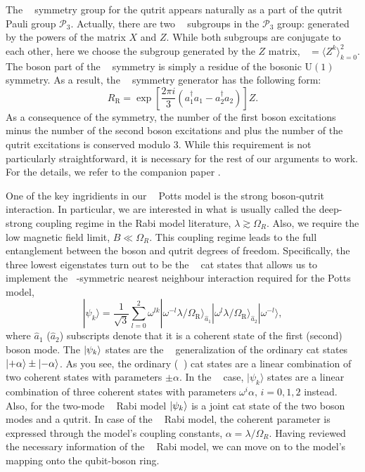 \documentclass[reprint, aps, prx, amsmath, amssymb, longbibliography, superscriptaddress]{revtex4-2}
\DeclareMathOperator{\Zthree}{\mathbb{Z}_3}
\DeclareMathOperator{\Ztwo}{\mathbb{Z}_2}
\begin{document}
The $\Zthree$ symmetry group for the qutrit appears naturally as a part of the qutrit Pauli group $\mathcal{P}_3$. Actually, there are two $\Zthree$ subgroups in the $\mathcal{P}_3$ group: generated by the powers of the matrix $X$ and $Z$. While both subgroups are conjugate to each other, here we choose the subgroup generated by the $Z$ matrix, $\Zthree = \langle Z^k \rangle_{k=0}^2$. The boson part of the $\Zthree$ symmetry is simply a residue of the bosonic $\mathrm{U(1)}$ symmetry. As a result, the $\Zthree$ symmetry generator has the following form:
\begin{equation}
     R_{\text{R}} = \exp\left[\frac{2\pi i}{3}(a_1^{\dagger}  a_1 -  a_2^{\dagger}  a_2)\right] Z.
\end{equation}
As a consequence of the symmetry, the number of the first boson excitations minus the number of the second boson excitations and plus the number of the qutrit excitations is conserved modulo 3. While this requirement is not particularly straightforward, it is necessary for the rest of our arguments to work. For the details, we refer to the companion paper \cite{lotkov_cat_}.

One of the key ingridients in our $\Zthree$ Potts model is the strong boson-qutrit interaction. In particular, we are interested in what is usually called the deep-strong coupling regime in the Rabi model literature, $\lambda \gtrsim \Omega_R$. Also, we require the low magnetic field limit, $ B \ll \Omega_R$. This coupling regime leads to the full entanglement between the boson and qutrit degrees of freedom. Specifically, the three lowest eigenstates turn out to be the $\Zthree$ cat states \cite{lotkov_cat_} that allows us to implement the $\Zthree$-symmetric nearest neighbour interaction required for the Potts model,
\begin{equation}
\label{three-cat-states}
    |\psi_k\rangle = \frac{1}{\sqrt{3}}\sum\limits_{l=0}^2 \omega^{lk}|\omega^{-l} \lambda/\Omega_{\text{R}}\rangle_{\hat a_1}|\omega^l \lambda/\Omega_{\text{R}}\rangle_{\hat a_2} |\omega^{-l} \rangle,
\end{equation}
where $\hat a_1$ ($\hat a_2$) subscripts denote that it is a coherent state of the first (second) boson mode.  The $\ket{\psi_k}$ states are the $\Zthree$ generalization of the ordinary cat states $\ket{+\alpha} \pm \ket{-\alpha}$. As you see, the ordinary ($\Ztwo$) cat states are a linear combination of two coherent states with parameters $\pm\alpha$. In the $\Zthree$ case, $|\psi_k\rangle$ states are a linear combination of three coherent states with parameters $\omega^i \alpha, \, i = 0,1,2$ instead. Also, for the two-mode $\Zthree$ Rabi model $\ket{\psi_k}$ is a joint cat state of the two boson modes and a qutrit. In case of the $\Zthree$ Rabi model, the coherent parameter is expressed through the model's coupling constants, $\alpha = \lambda/\Omega_R$. Having reviewed the necessary information of the $\Zthree$ Rabi model, we can move on to the model's mapping onto the qubit-boson ring.
\end{document}

